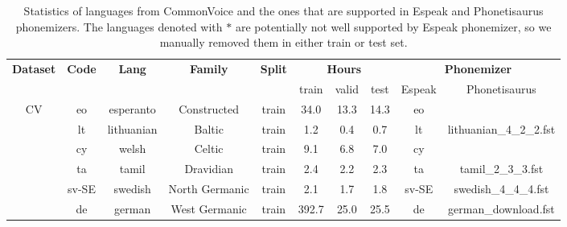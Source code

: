 \begin{table}[h!]
\caption{Statistics of languages from CommonVoice and the ones that are supported in Espeak and Phonetisaurus phonemizers. The languages denoted with $*$ are potentially not well supported by Espeak phonemizer, so we manually removed them in either train or test set. \label{tab:data_cv}}
\begin{center}
\begin{tabular}{@{}cccccccccc@{}}
\toprule
\multirow{2}{*}{\textbf{Dataset}} & \multirow{2}{*}{\textbf{Code}} & \multirow{2}{*}{\textbf{Lang}} & \multirow{2}{*}{\textbf{Family}} & \multirow{2}{*}{\textbf{Split}} & \multicolumn{3}{c}{\textbf{Hours}} & \multicolumn{2}{c}{\textbf{Phonemizer}} \\
                                  &                                &                                &                                  & & train      & valid      & test     & Espeak    & Phonetisaurus               \\
\cmidrule(lr){1-1} \cmidrule(lr){2-5} \cmidrule(lr){6-8} \cmidrule(lr){9-10}   
\multirow{42}{*}{CV}              & eo                             & esperanto                      & Constructed      &train                & 34.0       & 13.3       & 14.3     & eo        &                             \\
                                  & lt                             & lithuanian                     & Baltic           &train                & 1.2        & 0.4        & 0.7      & lt        & lithuanian\_4\_2\_2.fst     \\
                                  & cy                             & welsh                          & Celtic           &train                & 9.1        & 6.8        & 7.0      & cy        &                             \\
                                  & ta                             & tamil                          & Dravidian        &train                & 2.4        & 2.2        & 2.3      & ta        & tamil\_2\_3\_3.fst          \\
                                  & sv-SE                          & swedish                        & North Germanic   &train                & 2.1        & 1.7        & 1.8      & sv-SE     & swedish\_4\_4\_4.fst        \\
                                  & de                             & german                         & West Germanic     &train               & 392.7      & 25.0       & 25.5     & de        & german\_download.fst        \\

\end{tabular}
\end{center}
\end{table}
